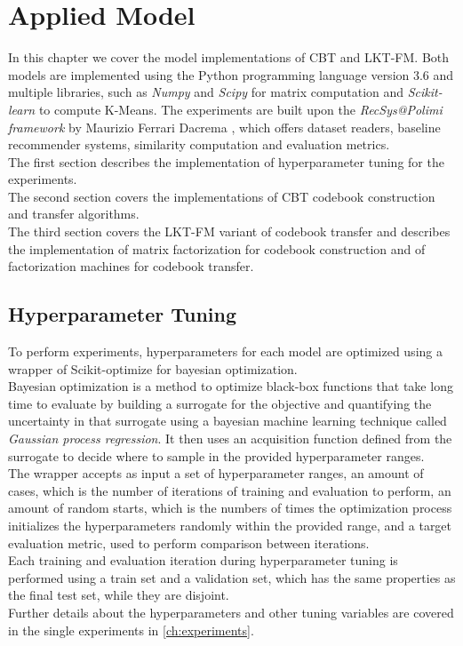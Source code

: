 \chapter{Applied Model}
\label{ch:applied-model}

In this chapter we cover the model implementations of CBT and LKT-FM. Both models are implemented using the Python programming language version 3.6 and multiple libraries, such as \textit{Numpy} \cite{10.1109/MCSE.2011.37} and \textit{Scipy} \cite{scipy} for matrix computation and \textit{Scikit-learn} \cite{10.5555/1953048.2078195} to compute K-Means. The experiments are built upon the \textit{RecSys@Polimi framework} by Maurizio Ferrari Dacrema \cite{recsys-polimi-framework}, which offers dataset readers, baseline recommender systems, similarity computation and evaluation metrics.\\
The first section describes the implementation of hyperparameter tuning for the experiments.\\
The second section covers the implementations of CBT codebook construction and transfer algorithms.\\
The third section covers the LKT-FM variant of codebook transfer and describes the implementation of matrix factorization for codebook construction and of factorization machines for codebook transfer.



\section{Hyperparameter Tuning}

To perform experiments, hyperparameters for each model are optimized using a wrapper of Scikit-optimize \cite{10.5281/zenodo.1170575} for bayesian optimization.\\
Bayesian optimization \cite{bayesian-optimization} is a method to optimize black-box functions that take long time to evaluate by building a surrogate for the objective and quantifying the uncertainty in that surrogate using a bayesian machine learning technique called \textit{Gaussian process regression}. It then uses an acquisition function defined from the surrogate to decide where to sample in the provided hyperparameter ranges.\\
The wrapper accepts as input a set of hyperparameter ranges, an amount of cases, which is the number of iterations of training and evaluation to perform, an amount of random starts, which is the numbers of times the optimization process initializes the hyperparameters randomly within the provided range, and a target evaluation metric, used to perform comparison between iterations.\\
Each training and evaluation iteration during hyperparameter tuning is performed using a train set and a validation set, which has the same properties as the final test set, while they are disjoint.\\
Further details about the hyperparameters and other tuning variables are covered in the single experiments in \autoref{ch:experiments}.



